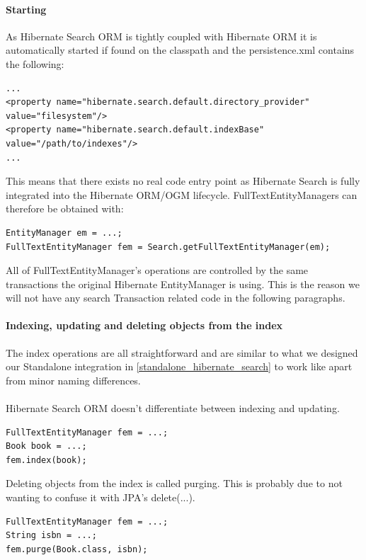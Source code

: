 \paragraph{Starting}
As Hibernate Search ORM is tightly coupled with Hibernate ORM it is automatically started if found on the classpath and the persistence.xml contains the following:
\\
\lstset{language=java}
\begin{lstlisting}[frame=htrbl, caption={Additions to persistence.xml with Hibernate Search ORM}, label={lst:hibernate_search_persistence.xml}]
...
<property name="hibernate.search.default.directory_provider"
value="filesystem"/>
<property name="hibernate.search.default.indexBase"
value="/path/to/indexes"/>
...
\end{lstlisting}
\noindent
This means that there exists no real code entry point as Hibernate Search is fully integrated into the Hibernate ORM/OGM lifecycle. FullTextEntityManagers can therefore be obtained with:
\\
\lstset{language=java}
\begin{lstlisting}[frame=htrbl, caption={Obtaining a FullTextEntityManager with Hibernate Search ORM}, label={lst:indexing_object_hsearch_orm_jpa.java}]
EntityManager em = ...;
FullTextEntityManager fem = Search.getFullTextEntityManager(em);
\end{lstlisting}
All of FullTextEntityManager's operations are controlled by the same transactions the original Hibernate EntityManager is using. This is the reason we will not have any search Transaction related code in the following paragraphs.

\paragraph{Indexing, updating and deleting objects from the index}
The index operations are all straightforward and are similar to what we designed our Standalone integration in \ref{standalone_hibernate_search} to work like apart from minor naming differences. 
\\\\
Hibernate Search ORM doesn't differentiate between indexing and updating.
\\
\lstset{language=java}
\begin{lstlisting}[frame=htrbl, caption={Indexing/Updating an object with Hibernate Search ORM}, label={lst:indexing_object_hsearch_orm_jpa.java}]
FullTextEntityManager fem = ...;
Book book = ...;
fem.index(book);
\end{lstlisting}
\noindent
Deleting objects from the index is called purging. This is probably due to not wanting to confuse it with JPA's delete(...).
\\
\lstset{language=java}
\begin{lstlisting}[frame=htrbl, caption={Deleting an object by id with Hibernate Search ORM}, label={lst:deleting_object_hsearch_orm_jpa.java}]
FullTextEntityManager fem = ...;
String isbn = ...;
fem.purge(Book.class, isbn);
\end{lstlisting}

